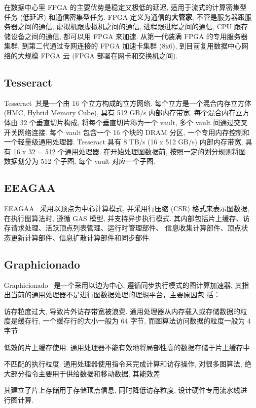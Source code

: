 \documentclass[UTF8,12pt,a4paper]{article}
\begin{document}
在数据中心里 FPGA 的主要优势是稳定又极低的延迟, 适用于流式的计算密集型任务 (低延迟) 和通信密集型任务.
FPGA 定义为通信的\textbf{大管家}, 不管是服务器跟服务器之间的通信, 虚拟机跟虚拟机之间的通信,
进程跟进程之间的通信, CPU 跟存储设备之间的通信, 都可以用 FPGA 来加速.
从第一代装满 FPGA 的专用服务器集群, 到第二代通过专网连接的 FPGA 加速卡集群 (8x6),
到目前复用数据中心网络的大规模 FPGA 云 (FPGA 部署在网卡和交换机之间).

\subsection{Tesseract}
Tesseract~\cite{DBLP:conf/isca/AhnHYMC15}其是一个由 16 个立方构成的立方网络.
每个立方是一个混合内存立方体(HMC, Hybrid Memory Cube), 具有 512 GB/s 内部内存带宽.
每个混合内存立方体由 32 个垂直切片构成, 将每个垂直切片称为一个 vault, 多个 vault 间通过交叉开关网络连接.
每个 vault 包含一个 16 个块的 DRAM 分区, 一个专用内存控制和一个轻量级通用处理器.
Tesseract 具有 8 TB/s (16 x 512 GB/s) 内部内存带宽, 具有 16 x 32 = 512 个通用处理器.
在开始处理图数据前, 按照一定的划分规则将图数据划分为 512 个子图, 每个 vault 对应一个子图.

\subsection{EEAGAA}
EEAGAA~\cite{DBLP:conf/isca/OzdalYKAGBO16} 采用以顶点为中心计算模式,
并采用行压缩 (CSR) 格式来表示图数据, 在执行图算法时, 遵循 GAS 模型, 并支持异步执行模式.
其内部包括片上缓存、访存请求处理、活跃顶点列表管理、运行时管理部件、
信息收集计算部件、顶点状态更新计算部件、信息扩散计算部件和同步部件.

\subsection{Graphicionado}
Graphicionado~\cite{DBLP:conf/micro/HamWSSM16}
是一个采用以边为中心, 遵循同步执行模式的图计算加速器,
其指出当前的通用处理器不是进行图数据处理的理想平台，主要原因包
括：
\begin{compactitem}
  \item 访存粒度过大, 导致片外访存带宽被浪费.
  通用处理器从内存载入或存储数据的粒度是缓存行,
  一个缓存行的大小一般为 64 字节, 而图算法访问数据的粒度一般为 4 字节
  \item 低效的片上缓存使用. 通用处理器不能有效地将局部性高的数据存储于片上缓存中
  \item 不匹配的执行粒度. 通用处理器使用指令来完成计算和访存操作,
  对很多图算法, 绝大部分指令主要用于供给数据和移动数据, 其能效差.
\end{compactitem}
其建立了片上存储用于存储顶点信息, 同时降低访存粒度, 设计硬件专用流水线进行图计算.
\clearpage
\end{document}
